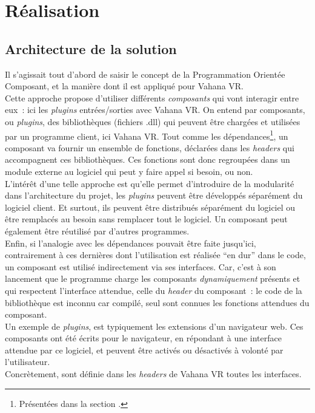 \section{Réalisation}
\subsection{Architecture de la solution}
Il s'agissait tout d'abord de saisir le concept de la Programmation Orientée Composant, et la manière
dont il est appliqué pour Vahana VR.\\
Cette approche propose d'utiliser différents \emph{composants}
qui vont interagir entre eux~: ici les \textit{plugins} entrées/sorties avec Vahana VR. On entend
par composants, ou \textit{plugins}, des bibliothèques (fichiers .dll) qui peuvent être chargées et utilisées
par un programme client, ici Vahana VR. Tout comme les dépendances\footnote{Présentées dans 
la section .}, un composant va fournir un ensemble
de fonctions, déclarées dans les \textit{headers} qui accompagnent ces
bibliothèques. Ces fonctions sont donc regroupées dans un module externe
au logiciel qui peut y faire appel si besoin, ou non.\cite{poc}\\
L'intérêt d'une telle approche est qu'elle permet d'introduire de la modularité dans 
l'architecture du projet, les \textit{plugins} peuvent être développés séparément du logiciel
client. Et surtout, ils peuvent être distribués séparément du logiciel ou être remplacés
au besoin sans remplacer tout le logiciel. Un composant peut également être réutilisé par d'autres programmes.\\
Enfin, si l'analogie avec les dépendances pouvait être faite jusqu'ici, contrairement à ces
dernières dont l'utilisation est réalisée \enquote{en dur} dans le code, un composant est
utilisé indirectement via ses interfaces. Car, c'est à son lancement que le programme charge les composants
\emph{dynamiquement} présents et qui respectent l'interface attendue, celle du
\textit{header} du composant~: le code de la bibliothèque est inconnu car compilé, seul sont
connues les fonctions attendues du composant.\cite{plugin}\\
Un exemple de \textit{plugins}, est typiquement les extensions d'un navigateur web. Ces composants
ont été écrits pour le navigateur, en répondant à une interface attendue par ce logiciel,
et peuvent être activés ou désactivés à volonté par l'utilisateur.\\
\newline
Concrètement, sont définie dans les \textit{headers} de Vahana VR toutes les interfaces.
